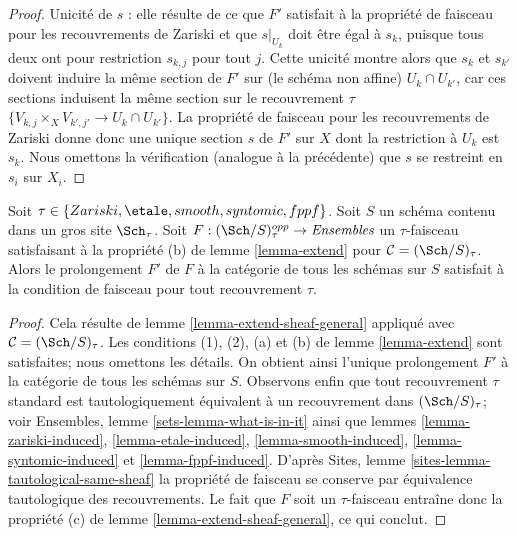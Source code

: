 \begin{proof}
\medskip\noindent
Unicité de $s$ : elle résulte de ce que $F'$ satisfait à la
propriété de faisceau pour les recouvrements de Zariski et que $s|_{U_k}$ doit être égal
à $s_k$, puisque tous deux ont pour restriction $s_{k, j}$ pour tout $j$.
Cette unicité montre alors que $s_k$ et $s_{k'}$ doivent induire
la même section de $F'$ sur (le schéma non affine) $U_k \cap U_{k'}$,
car ces sections induisent la même section sur le
recouvrement $\tau$ $\{V_{k, j} \times_X V_{k', j'} \to U_k \cap U_{k'}\}$.
La propriété de faisceau pour les recouvrements de Zariski donne donc une unique
section $s$ de $F'$ sur $X$ dont la restriction à $U_k$ est $s_k$.
Nous omettons la vérification (analogue à la précédente) que $s$ se restreint
en $s_i$ sur $X_i$.
\end{proof}

\begin{lemma}
\label{lemma-extend-sheaf}
Soit $\tau \in \{Zariski, \etale, smooth, syntomic, fppf\}$.
Soit $S$ un schéma contenu dans un gros site $\Sch_\tau$.
Soit $F : (\Sch/S)_\tau^{opp} \to \textit{Ensembles}$ un $\tau$-faisceau
satisfaisant à la propriété (b) de lemme \ref{lemma-extend} pour
$\mathcal{C} = (\Sch/S)_\tau$. Alors le prolongement
$F'$ de $F$ à la catégorie de tous les schémas sur $S$
satisfait à la condition de faisceau pour tout recouvrement $\tau$.
\end{lemma}

\begin{proof}
Cela résulte de lemme \ref{lemma-extend-sheaf-general}
appliqué avec $\mathcal{C} = (\Sch/S)_\tau$.
Les conditions (1), (2), (a) et (b) de lemme \ref{lemma-extend}
sont satisfaites; nous omettons les détails. On obtient ainsi l'unique prolongement $F'$
à la catégorie de tous les schémas sur $S$. Observons enfin que
tout recouvrement $\tau$ standard est tautologiquement équivalent à un
recouvrement dans $(\Sch/S)_\tau$; voir Ensembles, lemme \ref{sets-lemma-what-is-in-it}
ainsi que lemmes \ref{lemma-zariski-induced},
\ref{lemma-etale-induced},
\ref{lemma-smooth-induced},
\ref{lemma-syntomic-induced} et
\ref{lemma-fppf-induced}. D'après
Sites, lemme \ref{sites-lemma-tautological-same-sheaf}
la propriété de faisceau se conserve par équivalence tautologique
des recouvrements. Le fait que $F$ soit un $\tau$-faisceau entraîne donc
la propriété (c) de lemme \ref{lemma-extend-sheaf-general},
ce qui conclut.
\end{proof}











